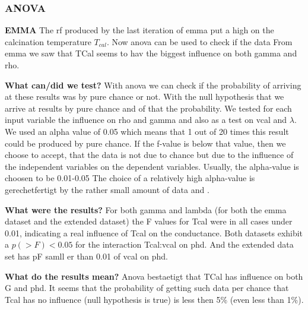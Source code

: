 \label{sec:res-post-emma}
\subsubsection{ANOVA}\label{sec:res-anova}
\textbf{EMMA}
The \gls{rf} produced by the last iteration of \gls{emma} put a high  
on the calcination temperature $T_{cal}$. 
Now \gls{anova} can be used to check if the data 
From emma we saw that TCal seems to hav the biggest influence on 
both gamma and rho. 

\textbf{What can/did we test?}
With anova we can check if the probability of arriving at these results was by pure chance or not. 
With the null hypothesis that we arrive at results by pure chance and of that the probability. 
We tested for each input variable the influence on rho and gamma 
and also as a test on vcal and $\lambda$. 
We used an alpha value of 0.05 which means that 1 out of 20 times this result could be 
produced by pure chance. 
If the f-value is below that value, then we choose to accept, that the data is not due to
chance but due to the influence of the independent variables on the dependent variables. 
Usually, the alpha-value is choosen to be 0.01-0.05\cite{hoffman2020concept,sellke2001pvalues}
The choice of a relatively high alpha-value is gerechetfertigt by the rather small amount of data and .

\textbf{What were the results?}
For both gamma and lambda (for both the emma dataset and the extended dataset) 
the F values for Tcal were in all cases under 0.01, 
indicating a real influence of Tcal on the conductance.
Both datasets exhibit a $p(>F) < 0.05$ for the interaction Tcal:vcal on phd. 
And the extended data set has pF samll er than 0.01 of vcal on phd. 

\textbf{What do the results mean?} 
Anova bestaetigt that TCal has influence on both G and phd. 
It seems that the probability of getting such data per chance that Tcal has no influence 
(null hypothesis is true) is less then 5\% (even less than 1\%). 

